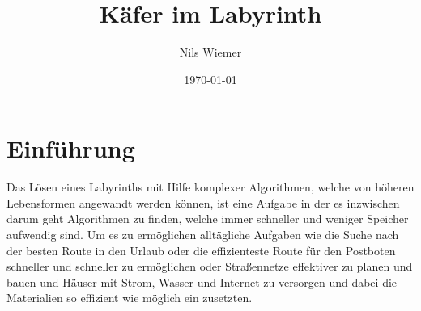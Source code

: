 \documentclass[12pt, a4paper, titlepage]{article}
\title{Käfer im Labyrinth}
\author{Nils Wiemer}
\date{\today}
\begin{document}
\maketitle









\tableofcontents

\newpage

\section{Einführung}

Das Lösen eines Labyrinths mit Hilfe komplexer Algorithmen, welche von höheren Lebensformen angewandt werden können, ist eine Aufgabe in der es inzwischen darum geht Algorithmen zu finden, welche immer schneller und weniger Speicher aufwendig sind.
Um es zu ermöglichen alltägliche Aufgaben wie die Suche nach der besten Route in den Urlaub oder die effizienteste Route für den Postboten schneller und schneller zu ermöglichen oder Straßennetze effektiver zu planen und bauen und Häuser mit Strom, Wasser und Internet zu versorgen und dabei die Materialien so effizient wie möglich ein zusetzten.
\end{document}
